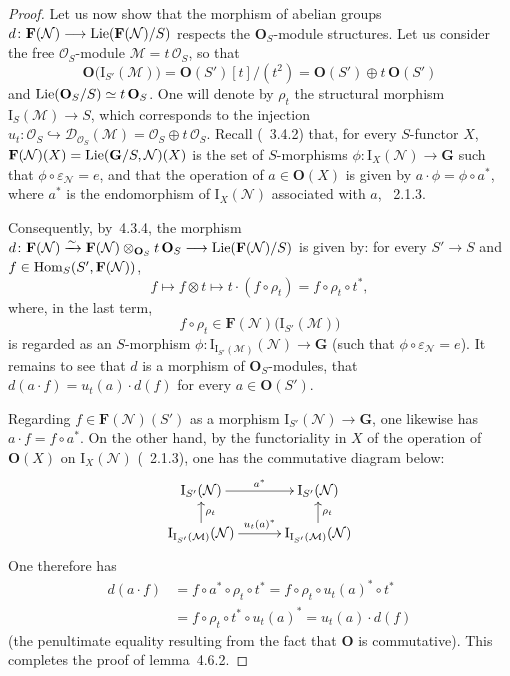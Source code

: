 \begin{proof}
Let us now show that the morphism of abelian groups
\(d\colon\mathbf{F}(\mathcal{N})\longrightarrow\operatorname{Lie}(\mathbf{F}(\mathcal{N})/S)\) respects the
\(\mathbf{O}_{S}\)-module structures. Let us consider the free
\(\mathcal{O}_{S}\)-module \(\mathcal{M}=t\,\mathcal{O}_{S}\), so that
\[
\mathbf{O}\bigl(\mathrm{I}_{S'}(\mathcal{M})\bigr)
  =\mathbf{O}(S')[t]/(t^{2})
  =\mathbf{O}(S')\oplus t\,\mathbf{O}(S')
\]
and \(\operatorname{Lie}(\mathbf{O}_{S}/S)\simeq t\,\mathbf{O}_{S}\). One will denote by \(\rho_{t}\)
the structural morphism \(\mathrm{I}_{S}(\mathcal{M})\to S\), which corresponds to the
injection
\(u_{t}\colon\mathcal{O}_{S}\hookrightarrow\mathcal{D}_{\mathcal{O}_{S}}(\mathcal{M})
=\mathcal{O}_{S}\oplus t\,\mathcal{O}_{S}\). Recall (\cf~3.4.2) that, for every
\(S\)-functor \(X\),
\(\mathbf{F}(\mathcal{N})(X)=\operatorname{Lie}(\mathbf{G}/S,\mathcal{N})(X)\) is the set of
\(S\)-morphisms \(\phi\colon\mathrm{I}_{X}(\mathcal{N})\to\mathbf{G}\) such that
\(\phi\circ\varepsilon_{\mathcal{N}}=e\), and that the operation of
\(a\in\mathbf{O}(X)\) is given by \(a\cdot\phi=\phi\circ a^{*}\), where \(a^{*}\) is
the endomorphism of \(\mathrm{I}_{X}(\mathcal{N})\) associated with \(a\), \cf~2.1.3.

Consequently, by~4.3.4, the morphism
\(d\colon\mathbf{F}(\mathcal{N})\xrightarrow{\sim}
\mathbf{F}(\mathcal{N})\otimes_{\mathbf{O}_{S}}t\,\mathbf{O}_{S}
\longrightarrow\operatorname{Lie}(\mathbf{F}(\mathcal{N})/S)\)
is given by: for every \(S'\to S\) and
\(f\in\operatorname{Hom}_{S}(S',\mathbf{F}(\mathcal{N}))\),
\[
f\mapsto f\otimes t\mapsto t\cdot(f\circ\rho_{t})=f\circ\rho_{t}\circ t^{*},
\]
where, in the last term,
\[
f\circ\rho_{t}\in\mathbf{F}(\mathcal{N})\bigl(\mathrm{I}_{S'}(\mathcal{M})\bigr)
\]
is
regarded as an \(S\)-morphism
\(\phi\colon\mathrm{I}_{\mathrm{I}_{S'}(\mathcal{M})}(\mathcal{N})\to\mathbf{G}\)
(such that \(\phi\circ\varepsilon_{\mathcal{N}}=e\)). It remains to see that \(d\) is
a morphism of \(\mathbf{O}_{S}\)-modules, \ie that
\(d(a\cdot f)=u_{t}(a)\cdot d(f)\) for every \(a\in\mathbf{O}(S')\).

Regarding \(f\in\mathbf{F}(\mathcal{N})(S')\) as a morphism
\(\mathrm{I}_{S'}(\mathcal{N})\to\mathbf{G}\), one likewise has
\(a\cdot f=f\circ a^{*}\). On the other hand, by the functoriality in \(X\) of the
operation of \(\mathbf{O}(X)\) on \(\mathrm{I}_{X}(\mathcal{N})\) (\cf~2.1.3), one has
the commutative diagram below:
\[
\xymatrix@C=3em@R=1.4em{
\mathrm{I}_{S'}(\mathcal{N}) \ar[r]^{a^{*}}
  & \mathrm{I}_{S'}(\mathcal{N}) \\
\mathrm{I}_{\mathrm{I}_{S'}(\mathcal{M})}(\mathcal{N})
  \ar[u]_{\rho_{t}} \ar[r]^{u_{t}(a)^{*}}
  & \mathrm{I}_{\mathrm{I}_{S'}(\mathcal{M})}(\mathcal{N}) \ar[u]_{\rho_{t}}
}
\]
One therefore has
\begin{align*}
d(a\cdot f)
  &=f\circ a^{*}\circ\rho_{t}\circ t^{*}
   =f\circ\rho_{t}\circ u_{t}(a)^{*}\circ t^{*}\\
  &=f\circ\rho_{t}\circ t^{*}\circ u_{t}(a)^{*}
   =u_{t}(a)\cdot d(f)
\end{align*}
(the penultimate equality resulting from the fact that \(\mathbf{O}\) is
commutative). This completes the proof of lemma~4.6.2.
\end{proof}

